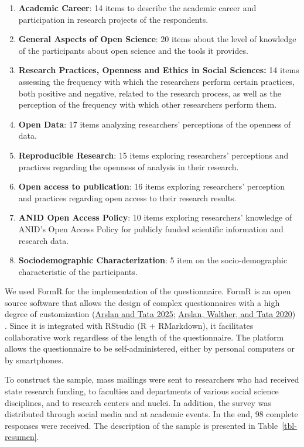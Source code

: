 \documentclass[
  letterpaper,
  DIV=11,
  numbers=noendperiod]{scrartcl}
\providecommand{\tightlist}{%
  \setlength{\itemsep}{0pt}\setlength{\parskip}{0pt}}\usepackage{longtable,booktabs,array}
\begin{document}
\begin{enumerate}
\def\labelenumi{\arabic{enumi}.}
\tightlist
\item
  \textbf{Academic Career}: 14 items to describe the academic career and
  participation in research projects of the respondents.
\item
  \textbf{General Aspects of Open Science}: 20 items about the level of
  knowledge of the participants about open science and the tools it
  provides.
\item
  \textbf{Research Practices, Openness and Ethics in Social Sciences:}
  14 items assessing the frequency with which the researchers perform
  certain practices, both positive and negative, related to the research
  process, as well as the perception of the frequency with which other
  researchers perform them.
\item
  \textbf{Open Data}: 17 items analyzing researchers' perceptions of the
  openness of data.
\item
  \textbf{Reproducible Research}: 15 items exploring researchers'
  perceptions and practices regarding the openness of analysis in their
  research.
\item
  \textbf{Open access to publication}: 16 items exploring researchers'
  perception and practices regarding open access to their research
  results.
\item
  \textbf{ANID Open Access Policy}: 10 items exploring researchers'
  knowledge of ANID's Open Access Policy for publicly funded scientific
  information and research data.
\item
  \textbf{Sociodemographic Characterization}: 5 item on the
  socio-demographic characteristic of the participants.
\end{enumerate}

We used FormR for the implementation of the questionnaire. FormR is an
open source software that allows the design of complex questionnaires
with a high degree of customization
(\protect\hyperlink{ref-arslan_chain_2025}{Arslan and Tata 2025};
\protect\hyperlink{ref-arslan_formr_2020}{Arslan, Walther, and Tata
2020}) . Since it is integrated with RStudio (R + RMarkdown), it
facilitates collaborative work regardless of the length of the
questionnaire. The platform allows the questionnaire to be
self-administered, either by personal computers or by smartphones.

To construct the sample, mass mailings were sent to researchers who had
received state research funding, to faculties and departments of various
social science disciplines, and to research centers and nuclei. In
addition, the survey was distributed through social media and at
academic events. In the end, 98 complete responses were received. The
description of the sample is presented in Table~\ref{tbl-resumen}.
\end{document}
